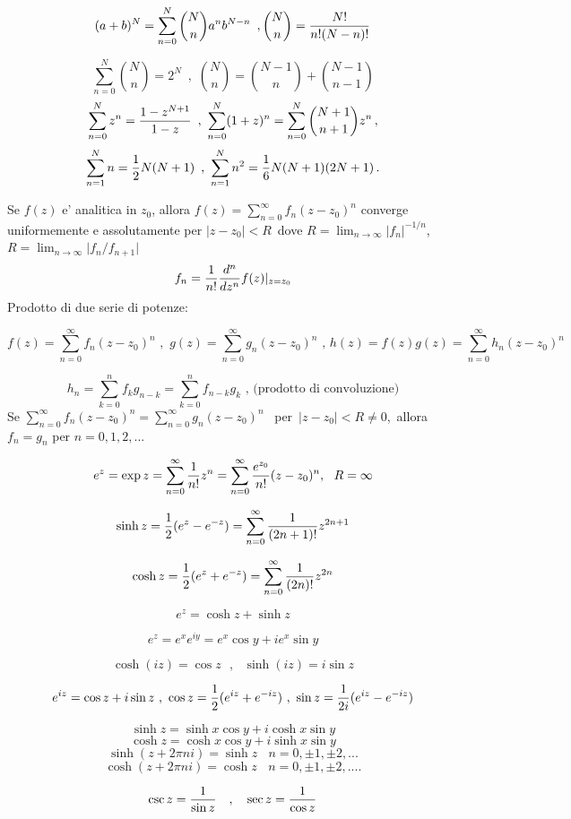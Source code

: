 \documentclass[,12pt]{article}
\begin{document}
$$(a +b)^N = \sum^N_{n=0} {N\choose n} a^n b^{N-n}\,\,\, , {N \choose n}=
{N! \over n! (N -n)!}$$

$$\sum^N_{n=0} {N \choose n} =2^N\,\,\, ,\,\, {N \choose n} = {N-1
\choose n} + {N-1 \choose n-1}$$
$$ \sum^N_{n=0} z^n ={1-z^{N+1}\over 1-z}\,\,\,,\,\,\sum^N_{n=0} (1+
z)^n =\sum^N_{n=0}{N+1 \choose n+1}z^n\,,$$
$$\sum^N_{n=1} n = {1\over 2} N(N+1)\,\,\, ,\,\,
\sum^N_{n=1}n^2=\frac{1}{6}N(N+1)(2N+1)\,.$$

\vskip 6pt
\noindent
Se $f(z)$ e' analitica in $z_0$, allora
$f (z) = \sum^\infty_{n=0} f_n (z -z_0)^n$ converge uniformemente e
assolutamente per $\vert z - z_0 \vert < R$\  dove $R = \lim_{n \rightarrow
\infty} \vert f_n \vert^{-1/n} $, \ $R = \lim_{n \rightarrow \infty}
\vert f_n / f_{n+1}\vert$ $$f_n = {1\over n!} {d^n\over dz^n}
f(z)\vert_{z=z_0}$$
Prodotto di due serie di potenze:

$$f (z) = \sum^\infty_{n=0} f_n (z -z_0)^n\,\, ,\,\, g(z) =
\sum^\infty_{n=0} g_n
(z-z_0)^n\,\,,\,h(z)=f(z)g(z)=\sum^\infty_{n=0} h_n (z-z_0)^n$$

$$h_{n} = \sum^n_{k=0} f_k g_{n-k} = \sum^n_{k=0} f_{n-k} g_k
\mbox {\ ,\ \ (prodotto di convoluzione)}$$ \noindent
Se $ \sum^\infty_{n=0} f_n (z -z_0)^n = \sum^\infty_{n=0} g_n (z-z_0)^n
\,\,\,$ per\,\,\,$ \vert z - z_0 \vert < R \neq 0$,\
allora $f_n = g_n$ per $n = 0,1,2,...$

$$e^z =\exp z= \sum^\infty_{n=0} {1 \over n!} z^n = \sum^\infty_{n=0}
{e^{z_0}\over n!} (z -z_0)^n,\ \  R=\infty$$

$$\sinh z = {1\over 2} (e^z - e^{-z}) = \sum^\infty_{n=0} {1\over
(2n+1)!} z^{2n+1}$$

$$\cosh z = {1\over 2} (e^z + e^{-z}) = \sum^\infty_{n=0} {1\over
(2n)!} z^{2n}$$

$$e^z = \cosh z + \sinh z$$

$$e^z = e^x e^{i y} = e^x \cos y + i e^x \sin y$$

$$\cosh (i z) = \cos z~~~,~~~\sinh (i z) = i \sin z$$

$$e^{i z} = \cos z + i \sin z\ ,\  \cos z ={1\over 2} (e^{iz}
  + e^{-iz})\ ,\
\sin z = {1\over 2i} (e^{i z} - e^{-i z})$$

$$\sinh z = \sinh x \cos y + i \cosh x \sin y$$
$$\cosh z = \cosh x \cos y+ i \sinh x \sin y$$
$$\sinh (z + 2 \pi ni) = \sinh z~~~~ n =0, \pm 1, \pm 2,...$$
$$\cosh (z + 2 \pi ni) = \cosh z~~~~ n =0, \pm 1, \pm 2,....$$

$$\csc z = {1\over \sin z}~~~,~~~ \sec z = {1\over \cos z}$$
\end{document}
